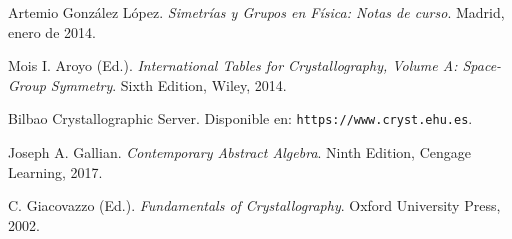 \documentclass{report}
\begin{document}
\newpage
\begin{thebibliography}{9}

Artemio González López. 
\textit{Simetrías y Grupos en Física: Notas de curso}. 
Madrid, enero de 2014.

Mois I. Aroyo (Ed.). 
\textit{International Tables for Crystallography, Volume A: Space-Group Symmetry}. 
Sixth Edition, Wiley, 2014.

Bilbao Crystallographic Server.  
Disponible en: \texttt{https://www.cryst.ehu.es}.

Joseph A. Gallian.  
\textit{Contemporary Abstract Algebra}.  
Ninth Edition, Cengage Learning, 2017.

C. Giacovazzo (Ed.).  
\textit{Fundamentals of Crystallography}.  
Oxford University Press, 2002.



\end{thebibliography}
\end{document}
